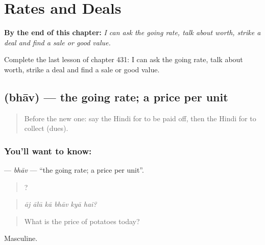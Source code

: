 
\chapter{Rates and Deals}
\label{ch:hi-rates-and-deals}

\begin{chapteropening}
\textbf{By the end of this chapter:} \emph{I can ask the going rate, talk about worth, strike a deal and find a sale or good value.}

Complete the last lesson of chapter 431: I can ask the going rate, talk about worth, strike a deal and find a sale or good value.
\end{chapteropening}

\section[\texorpdfstring{\hi{भाव} (bhāv)}{भाव (bhāv)}]{ (bhāv) — the going rate; a price per unit}

\label{lesson:HI-C431-bhav}



\begin{quote}
Before the new one: say the Hindi for to be paid off, then the Hindi for to collect (dues).
\end{quote}

\subsection*{You'll want to know: }
\textbf{} — \emph{bhāv} — \textquotedblleft{}the going rate; a price per unit\textquotedblright{}.

\begin{quote}
     ?
\end{quote}

\begin{quote}
\emph{āj ālū kā bhāv kyā hai?}
\end{quote}

\begin{quote}
What is the price of potatoes today?
\end{quote}

Masculine.

